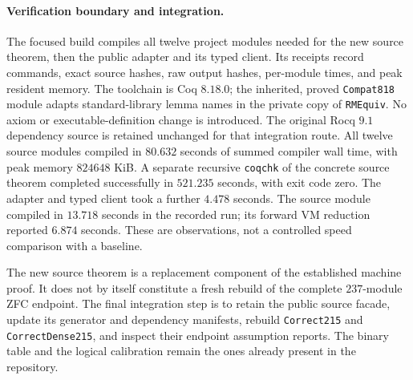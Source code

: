 \paragraph{Verification boundary and integration.}
The focused build compiles all twelve project modules needed for the new source
theorem, then the public adapter and its typed client. Its receipts record
commands, exact source hashes, raw output hashes, per-module times, and peak
resident memory. The toolchain is Coq $8.18.0$; the inherited, proved
\texttt{Compat818} module adapts standard-library lemma names in the private
copy of \texttt{RMEquiv}. No axiom or executable-definition change is introduced.
The original Rocq $9.1$ dependency source is retained unchanged for that
integration route. All twelve source modules compiled in $80.632$ seconds of summed compiler
wall time, with peak memory $824648$ KiB. A separate recursive \texttt{coqchk}
of the concrete source theorem completed successfully in $521.235$ seconds,
with exit code zero. The adapter and typed client took a further $4.478$ seconds.
The source module compiled in $13.718$ seconds in the recorded
run; its forward VM reduction reported $6.874$ seconds. These are observations,
not a controlled speed comparison with a baseline.

The new source theorem is a replacement component of the established machine
proof. It does not by itself constitute a fresh rebuild of the complete
$237$-module ZFC endpoint. The final integration step is to retain the public
source facade, update its generator and dependency manifests, rebuild
\texttt{Correct215} and \texttt{CorrectDense215}, and inspect their endpoint
assumption reports. The binary table and the logical calibration remain the
ones already present in the repository.
